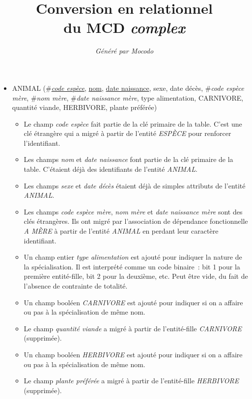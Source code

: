 \documentclass[a4paper]{article}
\title{Conversion en relationnel\\du MCD \emph{complex}}
\author{\emph{Généré par Mocodo}}
\newcommand{\relat}[1]{\textsc{#1}}
\newcommand{\attr}[1]{#1}
\newcommand{\prim}[1]{\uline{#1}}
\newcommand{\foreign}[1]{\#\textsl{#1}}
\begin{document}
\maketitle

\begin{itemize}
  \item \relat{ANIMAL} (\foreign{\prim{code espèce}}, \prim{nom}, \prim{date naissance}, \attr{sexe}, \attr{date décès}, \foreign{code espèce mère}, \foreign{nom mère}, \foreign{date naissance mère}, \attr{type alimentation}, \attr{CARNIVORE}, \attr{quantité viande}, \attr{HERBIVORE}, \attr{plante préférée})
  \begin{itemize}
    \item Le champ \emph{code espèce} fait partie de la clé primaire de la table. C'est une clé étrangère qui a migré à partir de l'entité \emph{ESPÈCE} pour renforcer l'identifiant.
    \item Les champs \emph{nom} et \emph{date naissance} font partie de la clé primaire de la table. C'étaient déjà des identifiants de l'entité \emph{ANIMAL}.
    \item Les champs \emph{sexe} et \emph{date décès} étaient déjà de simples attributs de l'entité \emph{ANIMAL}.
    \item Les champs \emph{code espèce mère}, \emph{nom mère} et \emph{date naissance mère} sont des clés étrangères. Ils ont migré par l'association de dépendance fonctionnelle \emph{A MÈRE} à partir de l'entité \emph{ANIMAL} en perdant leur caractère identifiant.
    \item Un champ entier \emph{type alimentation} est ajouté pour indiquer la nature de la spécialisation. Il est interprété comme un code binaire : bit 1 pour la première entité-fille, bit 2 pour la deuxième, etc. Peut être vide, du fait de l'absence de contrainte de totalité.
    \item Un champ booléen \emph{CARNIVORE} est ajouté pour indiquer si on a affaire ou pas à la spécialisation de même nom.
    \item Le champ \emph{quantité viande} a migré à partir de l'entité-fille \emph{CARNIVORE} (supprimée).
    \item Un champ booléen \emph{HERBIVORE} est ajouté pour indiquer si on a affaire ou pas à la spécialisation de même nom.
    \item Le champ \emph{plante préférée} a migré à partir de l'entité-fille \emph{HERBIVORE} (supprimée).
  \end{itemize}


\end{itemize}
\end{document}
